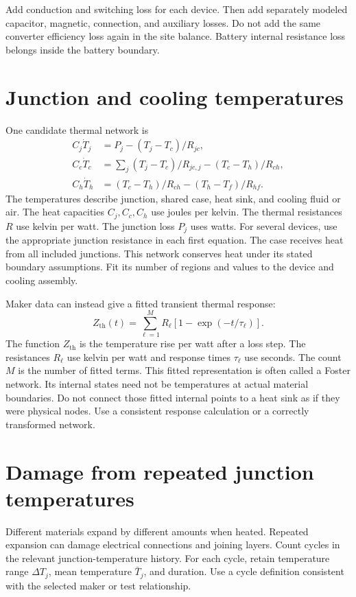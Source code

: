 \documentclass[11pt,a4paper]{report}
\begin{document}
Add conduction and switching loss for each device.
Then add separately modeled capacitor, magnetic, connection, and auxiliary losses.
Do not add the same converter efficiency loss again in the site balance.
Battery internal resistance loss belongs inside the battery boundary.

\section{Junction and cooling temperatures}
One candidate thermal network is
\begin{align}
C_j\dot T_j&=P_j-(T_j-T_c)/R_{jc},\\
C_c\dot T_c&=\sum_j(T_j-T_c)/R_{jc,j}-(T_c-T_h)/R_{ch},\\
C_h\dot T_h&=(T_c-T_h)/R_{ch}-(T_h-T_f)/R_{hf}.
\label{eq:converter-thermal}
\end{align}
The temperatures describe junction, shared case, heat sink, and cooling fluid or air.
The heat capacities $C_j,C_c,C_h$ use joules per kelvin.
The thermal resistances $R$ use kelvin per watt.
The junction loss $P_j$ uses watts.
For several devices, use the appropriate junction resistance in each first equation.
The case receives heat from all included junctions.
This network conserves heat under its stated boundary assumptions.
Fit its number of regions and values to the device and cooling assembly.

Maker data can instead give a fitted transient thermal response:
\begin{equation}
Z_{\mathrm{th}}(t)=\sum_{\ell=1}^{M}
R_\ell[1-\exp(-t/\tau_\ell)].
\end{equation}
The function $Z_{\mathrm{th}}$ is the temperature rise per watt after a loss step.
The resistances $R_\ell$ use kelvin per watt and response times $\tau_\ell$ use seconds.
The count $M$ is the number of fitted terms.
This fitted representation is often called a Foster network.
Its internal states need not be temperatures at actual material boundaries.
Do not connect those fitted internal points to a heat sink as if they were physical nodes.
Use a consistent response calculation or a correctly transformed network.

\section{Damage from repeated junction temperatures}
Different materials expand by different amounts when heated.
Repeated expansion can damage electrical connections and joining layers.
Count cycles in the relevant junction-temperature history.
For each cycle, retain temperature range $\Delta T_j$, mean temperature $\bar T_j$, and duration.
Use a cycle definition consistent with the selected maker or test relationship.
\end{document}
